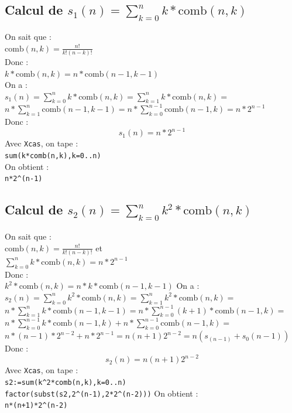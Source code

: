 \documentclass[a4paper,11pt]{book}
\begin{document}
\subsection{Calcul de $s_1(n)=\sum_{k=0}^nk*\mbox{comb}(n,k)$}
On sait que :\\
$\mbox{comb}(n,k)=\frac{n!}{k!(n-k)!}$\\
Donc :\\
$k*\mbox{comb}(n,k)=n*\mbox{comb}(n-1,k-1)$\\
On a  :\\
$s_1(n)=\sum_{k=0}^nk*\mbox{comb}(n,k)=\sum_{k=1}^nk*\mbox{comb}(n,k)=$\\
$n*\sum_{k=1}^n\mbox{comb}(n-1,k-1)=n*\sum_{k=0}^{n-1}\mbox{comb}(n-1,k)=n*2^{n-1}$\\
Donc :
$$s_1(n)=n*2^{n-1}$$
Avec {\tt Xcas}, on tape :\\
{\tt sum(k*comb(n,k),k=0..n)}\\
On obtient :\\
{\tt n*2\verb|^|(n-1)}
\subsection{Calcul de $s_2(n)=\sum_{k=0}^nk^2*\mbox{comb}(n,k)$}
On sait que :\\
$\mbox{comb}(n,k)=\frac{n!}{k!(n-k)!}$ et\\
$\sum_{k=0}^nk*\mbox{comb}(n,k)=n*2^{n-1}$\\
Donc :\\
$k^2*\mbox{comb}(n,k)=n*k*\mbox{comb}(n-1,k-1)$
On a  :\\
$s_2(n)=\sum_{k=0}^nk^2*\mbox{comb}(n,k)=\sum_{k=1}^nk^2*\mbox{comb}(n,k)=$\\
$n*\sum_{k=1}^nk*\mbox{comb}(n-1,k-1)=n*\sum_{k=0}^{n-1}(k+1)*\mbox{comb}(n-1,k)=$\\
$n*\sum_{k=0}^{n-1}k*\mbox{comb}(n-1,k)+n*\sum_{k=0}^{n-1}\mbox{comb}(n-1,k)=$\\
$n*(n-1)*2^{n-2}+n*2^{n-1}=n(n+1)2^{n-2}=n(s_(n-1)+s_0(n-1))$\\
Donc :
$$s_2(n)=n(n+1)2^{n-2}$$
Avec {\tt Xcas}, on tape :\\
{\tt s2:=sum(k\verb|^|2*comb(n,k),k=0..n)}\\
{\tt factor(subst(s2,2\verb|^|(n-1),2*2\verb|^|(n-2)))}
On obtient :\\
{\tt n*(n+1)*2\verb|^|(n-2)}
\end{document}
